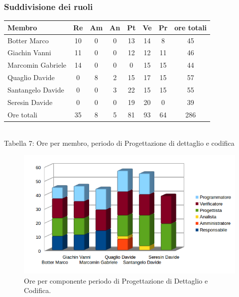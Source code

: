 \subsubsection{Suddivisione dei ruoli}
\begin{center}
\begin{tabular}{| l | c | c | c | c | c | c | c |}
\hline
Membro & Re & Am & An & Pt & Ve & Pr & ore totali \\
\hline
Botter Marco & 10 & 0 & 0 & 13 & 14 & 8 & 45 \\

Giachin Vanni & 11 & 0 & 0 & 12 & 12 & 11 & 46 \\

Marcomin Gabriele & 14 & 0 & 0 & 0 & 15 & 15 & 44 \\

Quaglio Davide & 0 & 8 & 2 & 15 & 17 & 15 & 57 \\

Santangelo Davide & 0 & 0 & 3 & 22 & 15 & 15 & 55 \\

Seresin Davide & 0 & 0 & 0 & 19 & 20 & 0 & 39 \\
\hline
Ore totali & 35 & 8 & 5 & 81 & 93 & 64 & 286 \\
\hline
\end{tabular}
\\
Tabella 7: Ore per membro, periodo di Progettazione di dettaglio e codifica
\end{center}
\begin{figure}[H] \centering \includegraphics[width=%
\textwidth]
{../modello/img/3.png} \caption{ Ore per componente periodo di Progettazione di Dettaglio e Codifica.}
\end{figure}
